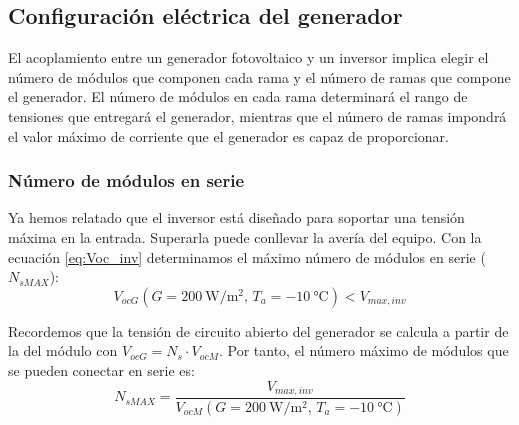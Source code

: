 \subsection{Configuración eléctrica del generador}
\label{sub:ConfiguracionGenerador}

El acoplamiento entre un generador fotovoltaico y un inversor implica
elegir el número de módulos que componen cada rama y el número de
ramas que compone el generador. El número de módulos en cada rama
determinará el rango de tensiones que entregará el generador, mientras
que el número de ramas impondrá el valor máximo de corriente que el
generador es capaz de proporcionar.

\subsubsection{Número de módulos en serie}
\label{sec:Ns}

Ya hemos relatado que el inversor está diseñado para soportar una
tensión máxima en la entrada. Superarla puede conllevar la avería
del equipo. Con la ecuación \ref{eq:Voc_inv} determinamos el máximo
número de módulos en serie ($N_{sMAX}$):
\begin{equation}
V_{ocG}(G=\SI{200}{\watt\per\meter\squared},\,
T_{a}=\SI{-10}{\celsius})<V_{max,inv}
\label{eq:Voc_inv}
\end{equation}


Recordemos que la tensión de circuito abierto del generador se calcula
a partir de la del módulo con $V_{ocG}=N_{s}\cdot V_{ocM}$.
Por tanto, el número máximo de módulos que se pueden conectar en
serie es:
\begin{equation}
  \label{eq:Nsmax}
  N_{sMAX}=\frac{V_{max,inv}}{V_{ocM}(G=\SI{200}{\watt\per\meter\squared},\, T_{a}=\SI{-10}{\celsius})}
\end{equation}


